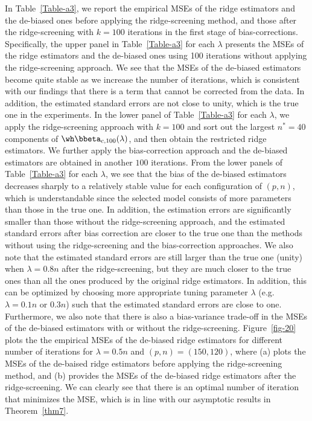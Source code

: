 In Table~\ref{Table-a3}, we report the empirical MSEs of the ridge estimators and the de-biased ones before applying the ridge-screening method, and those after the ridge-screening with $k=100$ iterations in the first stage of bias-corrections.
Specifically, the upper panel in Table~\ref{Table-a3} for each $\lambda$ presents 
the MSEs of the ridge estimators and the de-biased ones using 100 iterations without applying the ridge-screening approach. We see that the MSEs of the de-biased estimators become quite stable as we increase the number of iterations, which is consistent with our findings that there is a term that cannot be corrected from the data. In addition, the estimated standard errors are not close to unity, which is the true one in the experiments. In the lower panel of Table~\ref{Table-a3} for each $\lambda$, we apply the ridge-screening approach with $k=100$ and sort out the largest $n^*=40$ components of $\wh\bbeta_{c,100}(\lambda)$, and then obtain the restricted ridge estimators. We further apply the bias-correction approach and the de-biased estimators are obtained in another $100$ iterations. From the lower panels of Table~\ref{Table-a3} for each $\lambda$, we see that the bias of the de-biased estimators decreases sharply to a relatively stable value for each configuration of $(p,n)$, which is understandable since the selected model consists of more parameters than those in the true one. In addition, the estimation errors are significantly smaller than those without the ridge-screening approach, and the estimated standard errors after bias correction are closer to the true one than the methods without using the ridge-screening and the bias-correction approaches. We also note that the estimated standard errors are still larger than the true one (unity) when $\lambda=0.8n$ after the ridge-screening, but they are much closer to the true ones than all the ones produced by the original ridge estimators. In addition, this can be optimized by choosing more appropriate tuning parameter $\lambda$ (e.g. $\lambda=0.1n$ or $0.3n$) such that the estimated standard errors are close to one. Furthermore, we also note that there is also a bias-variance trade-off in the MSEs of the de-biased estimators with or without the ridge-screening. Figure~\ref{fig-20} plots the the empirical MSEs of the de-biased ridge estimators for different number of iterations for $\lambda=0.5n$ and $(p,n)=(150,120)$, where (a) plots the MSEs of the de-baised ridge estimators  before applying the ridge-screening method, and (b) provides the MSEs of the de-biased  ridge estimators after the ridge-screening.  We can clearly see that there is an optimal number of iteration that minimizes the MSE, which is in line with our asymptotic results in Theorem~\ref{thm7}.

